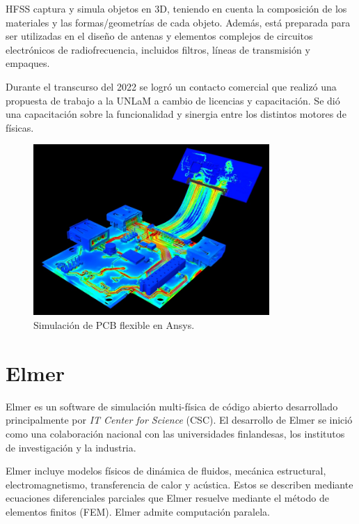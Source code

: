 \documentclass[
    11pt,
    spanish,
    a4paper
]{article}
\begin{document}
HFSS captura y simula objetos en 3D, teniendo en cuenta la composición de los materiales y las formas/geometrías de cada objeto.
Además, está preparada para ser utilizadas en el diseño de antenas y elementos complejos de circuitos electrónicos de radiofrecuencia, incluidos filtros, líneas de transmisión y empaques.

Durante el transcurso del 2022 se logró un contacto comercial que realizó una propuesta de trabajo a la UNLaM a cambio de licencias y capacitación.
Se dió una capacitación sobre la funcionalidad y sinergia entre los distintos motores de físicas.

\begin{figure}[htbp]
	\centering
	\includegraphics[width=0.8\textwidth]{img/ansys.jpg}
	\caption{Simulación de PCB flexible en Ansys.}
	\label{fig:ansys}
\end{figure}

\newpage


\section{Elmer}

Elmer es un software de simulación multi-física de código abierto desarrollado principalmente por \emph{IT Center for Science} (CSC).
El desarrollo de Elmer se inició como una colaboración nacional con las universidades finlandesas, los institutos de investigación y la industria.

Elmer incluye modelos físicos de dinámica de fluidos, mecánica estructural, electromagnetismo, transferencia de calor y acústica.
Estos se describen mediante ecuaciones diferenciales parciales que Elmer resuelve mediante el método de elementos finitos (FEM).
Elmer admite computación paralela.
\end{document}
